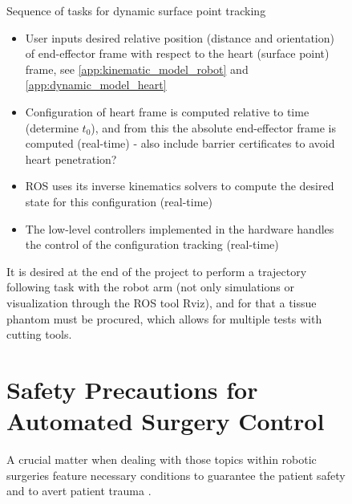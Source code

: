 \begin{exa}
\begin{figure}[H]
Sequence of tasks for dynamic surface point tracking
\vspace{-3mm}
\begin{itemize}
	\itemsep-1.3mm
	\item User inputs desired relative position (distance and orientation) of end-effector frame with respect to the heart (surface point) frame, see \autoref{app:kinematic_model_robot} and \ref{app:dynamic_model_heart}
	\item Configuration of heart frame is computed relative to time (determine $t_0$), and from this the absolute end-effector frame is computed (real-time) - also include barrier certificates to avoid heart penetration?
	\item ROS uses its inverse kinematics solvers to compute the desired state for this configuration (real-time)
	\item The low-level controllers implemented in the hardware handles the control of the configuration tracking (real-time)
\end{itemize}

It is desired at the end of the project to perform a trajectory following task with the robot arm (not only simulations or visualization through the ROS tool Rviz), and for that a tissue phantom must be procured, which allows for multiple tests with cutting tools.

\section{Safety Precautions for Automated Surgery Control}\label{sec:safety-def}
A crucial matter when dealing with those topics within robotic surgeries feature necessary conditions to guarantee the patient safety and to avert patient trauma \citep{bib:safety}.





\end{figure}
\end{exa}
